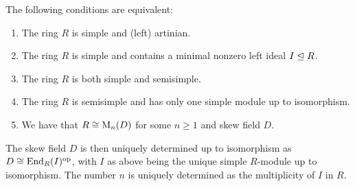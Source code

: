 \begin{theorem}[Wedderburn]
  \label{theorem: wedderburns theorem}
  The following conditions are equivalent:
  \begin{enumerate}
    \item
      \label{enumerate: simple and artinian}
      The ring $R$ is simple and (left) artinian.
    \item
      \label{enumerate: simple and minimal left ideal}
      The ring $R$ is simple and contains a minimal nonzero left ideal $I \trianglelefteq R$.
    \item
      \label{enumerate: simple and semisimple}
      The ring $R$ is both simple and semisimple.
    \item
      \label{enumerate: semisimple with unique simple}
      The ring $R$ is semisimple and has only one simple module up to isomorphism.
    \item
      \label{enumerate: matrix algebra over skew field}
      We have that $R \cong \operatorname{M}_n(D)$ for some $n \geq 1$ and skew field $D$.
  \end{enumerate}
  The skew field $D$ is then uniquely determined up to isomorphism as $D \cong \operatorname{End}_R(I)^{\operatorname{op}}$, with $I$ as above being the unique simple $R$-module up to isomorphism.
  The number $n$ is uniquely determined as the multiplicity of $I$ in $R$.
\end{theorem}


